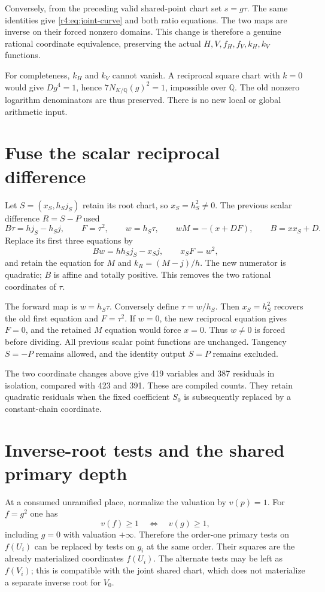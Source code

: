 Conversely, from the preceding valid shared-point chart set $s=g\tau$.
The same identities give \eqref{r4:eq:joint-curve} and both ratio equations.
The two maps are inverse on their forced nonzero domains.  This change is
therefore a genuine rational coordinate equivalence, preserving the
actual $H,V,f_H,f_V,k_H,k_V$ functions.

For completeness, $k_H$ and $k_V$ cannot vanish.  A reciprocal square
chart with $k=0$ would give $Dg^4=1$, hence
$7N_{K/\mathbb Q}(g)^2=1$, impossible over $\mathbb Q$.
The old nonzero logarithm denominators are thus preserved.  There is no
new local or global arithmetic input.

\section{Fuse the scalar reciprocal difference}

Let $S=(x_S,h_Sj_S)$ retain its root chart, so $x_S=h_S^2\ne0$.
The previous scalar difference $R=S-P$ used
\[
 B\tau=h j_S-h_Sj,\qquad F=\tau^2,\qquad
 w=h_S\tau,\qquad wM=-(x+DF),\qquad B=xx_S+D.
\]
Replace its first three equations by
\[
 \boxed{Bw=h h_Sj_S-x_Sj,\qquad x_SF=w^2,}
\]
and retain the equation for $M$ and $k_R=(M-j)/h$.
The new numerator is quadratic; $B$ is affine and totally positive.
This removes the two rational coordinates of $\tau$.

The forward map is $w=h_S\tau$.  Conversely define $\tau=w/h_S$.
Then $x_S=h_S^2$ recovers the old first equation and $F=\tau^2$.
If $w=0$, the new reciprocal equation gives $F=0$, and the retained
$M$ equation would force $x=0$.  Thus $w\ne0$ is forced before dividing.
All previous scalar point functions are unchanged.  Tangency $S=-P$
remains allowed, and the identity output $S=P$ remains excluded.

The two coordinate changes above give 419 variables and 387 residuals
in isolation, compared with 423 and 391.  These are compiled counts.
They retain quadratic residuals when the fixed coefficient $S_0$ is
subsequently replaced by a constant-chain coordinate.

\section{Inverse-root tests and the shared primary depth}

At a consumed unramified place, normalize the valuation by $v(p)=1$.
For $f=g^2$ one has
\[
 v(f)\ge1\quad\Longleftrightarrow\quad v(g)\ge1,
\]
including $g=0$ with valuation $+\infty$.  Therefore the order-one
primary tests on $f(U_i)$ can be replaced by tests on $g_i$ at the same
order.  Their squares are the already materialized coordinates $f(U_i)$.
The alternate tests may be left as $f(V_i)$; this is compatible with the
joint shared chart, which does not materialize a separate inverse root
for $V_0$.

